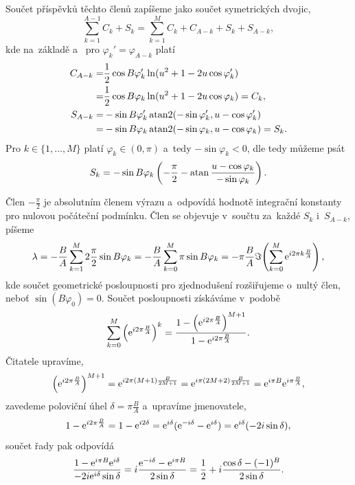 Součet příspěvků těchto členů zapíšeme jako součet symetrických dvojic,
\begin{equation}
    \sum_{k=1}^{A-1}C_k+S_k=\sum_{k=1}^{M}C_k+C_{A-k}+S_k+S_{A-k},
\end{equation}
kde na~základě  a~ pro $\varphi_k'=\varphi_{A-k}$ platí
\begin{align}
        C_{A-k}=&\frac{1}{2}\cos{B\varphi_k'}\ln(u^2+1-2u\cos\varphi_k')\nonumber\\
        =&\frac{1}{2}\cos{B\varphi_k}\ln(u^2+1-2u\cos\varphi_k)=C_k,\\
        S_{A-k}=&-\sin{B\varphi_k'}\operatorname{atan2}(-\sin{\varphi_k'},u-\cos{\varphi_k'})\nonumber\\
        =&-\sin{B\varphi_k}\operatorname{atan2}(-\sin{\varphi_k},u-\cos{\varphi_k})=S_k.
\end{align}
Pro $k\in\{1,\dots,M\}$ platí $\varphi_k\in(0,\pi)$ a~tedy $-\sin\varphi_k<0$, dle  tedy můžeme psát
\begin{equation}
    S_k=-\sin{B\varphi_k}\left(-\frac{\pi}{2}-\operatorname{atan}\frac{u-\cos\varphi_k}{-\sin\varphi_k}\right).
\end{equation}

Člen $-\frac{\pi}{2}$ je absolutním členem výrazu a~odpovídá hodnotě integrační konstanty pro nulovou počáteční podmínku. Člen se objevuje v~součtu za~každé $S_k$ i~$S_{A-k}$, píšeme
\begin{equation}
    \lambda = -\frac{B}{A}\sum_{k=1}^{M}2\frac{\pi}{2} \sin B\varphi_k=-\frac{B}{A}\sum_{k=0}^{M}\pi \sin B\varphi_k=-\pi\frac{B}{A}\Im\!\left(\sum_{k=0}^{M}\mathrm{e}^{i 2\pi k\frac{B}{A}}\right),
\end{equation}
kde součet geometrické posloupnosti pro zjednodušení rozšiřujeme o~nultý člen, neboť $\sin(B\varphi_0)=0$. Součet posloupnosti získáváme v~podobě
\begin{equation}
    \sum_{k=0}^{M}\left(\mathrm{e}^{i2\pi\frac{B}{A}}\right)^k = \frac{1-\left(\mathrm{e}^{i2\pi\frac{B}{A}}\right)^{M+1}}{1-\mathrm{e}^{i2\pi\frac{B}{A}}}.
\end{equation}
Čitatele upravíme,
\begin{equation}
    \left(\mathrm{e}^{i2\pi\frac{B}{A}}\right)^{M+1}=\mathrm{e}^{i2\pi (M+1)\frac{B}{2M+1}}=\mathrm{e}^{i\pi(2 M+2)\frac{B}{2M+1}}=\mathrm{e}^{i\pi B}\mathrm{e}^{i\pi\frac{B}{A}},
\end{equation}
zavedeme poloviční úhel $\delta=\pi\frac{B}{A}$ a~upravíme jmenovatele,
\begin{equation}
    1-\mathrm{e}^{i2\pi\frac{B}{A}}=1-\mathrm{e}^{i2\delta}=\mathrm{e}^{i\delta}(\mathrm{e}^{-i\delta}-\mathrm{e}^{i\delta})=\mathrm{e}^{i\delta}(-2i\sin{\delta}),
\end{equation}
součet řady pak odpovídá
\begin{equation}
    \frac{1-\mathrm{e}^{i\pi B}\mathrm{e}^{i\delta}}{-2i\mathrm{e}^{i\delta}\sin{\delta}}
    =i\frac{\mathrm{e}^{-i\delta}-\mathrm{e}^{i\pi B}}{2\sin{\delta}}
    =\frac{1}{2}+i\frac{\cos\delta-(-1)^B}{2\sin\delta}.
\end{equation}

